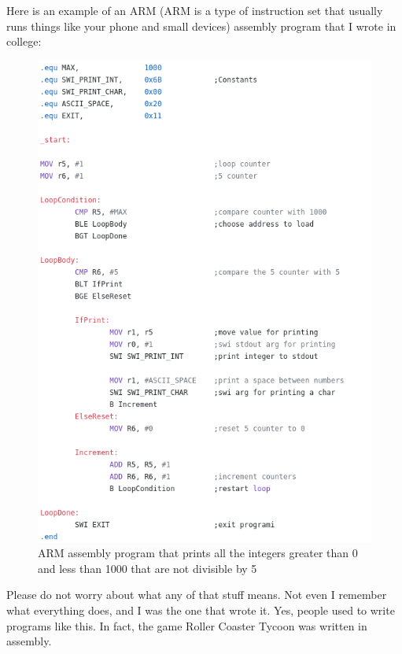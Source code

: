 \documentclass[11]{article}
\begin{document}
Here is an example of an ARM (ARM is a type of instruction set that usually runs things like your phone and small devices) assembly program that I wrote in college:

\begin{figure}[H]
	\centering
	\includegraphics[scale=0.5]{arm.png}
	\caption{ARM assembly program that prints all the integers greater than 0 and less than 1000 that are not divisible by 5}
\end{figure}



Please do not worry about what any of that stuff means. Not even I remember what everything does, and I was the one that wrote it. Yes, people used to write programs like this. In fact, the game Roller Coaster Tycoon was written in assembly.\\
\end{document}

